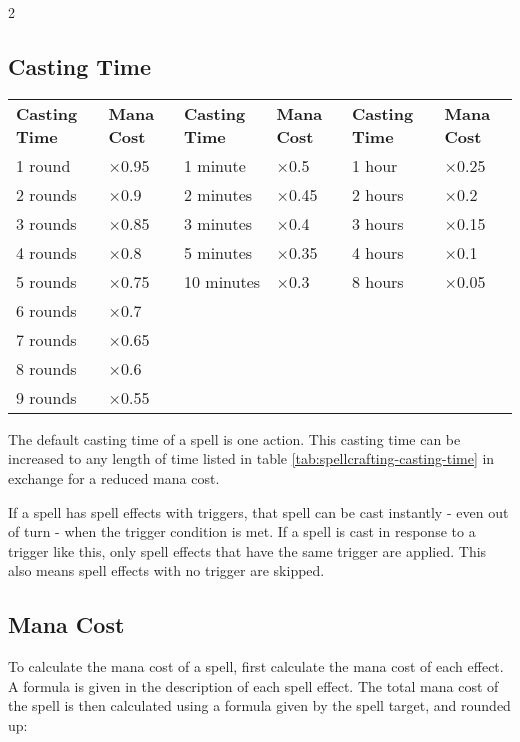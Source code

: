\begin{multicols*}{2}
    \subsection{Casting Time}
    \begin{table*}[ht]
        \unclassedrowcolors
        \begin{tabularx}{\textwidth}{l X l X l X}
            \textbf{Casting Time} & \textbf{Mana Cost} & \textbf{Casting Time} & \textbf{Mana Cost} & \textbf{Casting Time} & \textbf{Mana Cost} \\
            1 round  & $\times$0.95 & 1 minute   & $\times$0.5  & 1 hour  & $\times$0.25 \\
            2 rounds & $\times$0.9  & 2 minutes  & $\times$0.45 & 2 hours & $\times$0.2  \\
            3 rounds & $\times$0.85 & 3 minutes  & $\times$0.4  & 3 hours & $\times$0.15 \\
            4 rounds & $\times$0.8  & 5 minutes  & $\times$0.35 & 4 hours & $\times$0.1  \\
            5 rounds & $\times$0.75 & 10 minutes & $\times$0.3  & 8 hours & $\times$0.05 \\
            6 rounds & $\times$0.7  & & & & \\
            7 rounds & $\times$0.65 & & & & \\
            8 rounds & $\times$0.6  & & & & \\
            9 rounds & $\times$0.55 & & & & \\
        \end{tabularx}
        \caption{Spellcrafting Casting Time}
        \label{tab:spellcrafting-casting-time}
    \end{table*}
    The default casting time of a spell is one action. This casting time
    can be increased to any length of time listed in table
    \ref{tab:spellcrafting-casting-time} in exchange for a reduced mana cost.

    If a spell has spell effects with triggers, that spell can be cast
    instantly - even out of turn - when the trigger condition is met. If a
    spell is cast in response to a trigger like this, only spell effects
    that have the same trigger are applied. This also means spell effects
    with no trigger are skipped.

    \subsection{Mana Cost}
    To calculate the mana cost of a spell, first calculate the mana cost of
    each effect. A formula is given in the description of each spell effect.
    The total mana cost of the spell is then calculated using a formula given
    by the spell target, and rounded up:


\end{multicols*}
